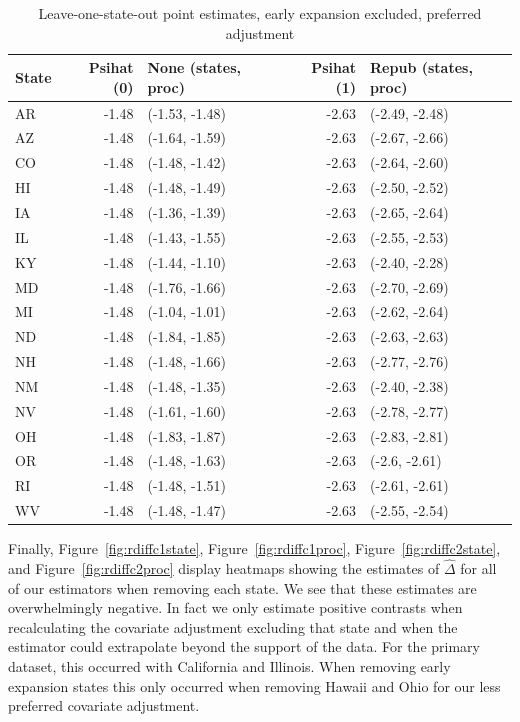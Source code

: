 \documentclass{article}
\begin{document}
\begin{appendix}
\begin{table}[ht]
\centering
   \caption{Leave-one-state-out point estimates, early expansion excluded, preferred adjustment}
    \label{tab:loostatec2}
\begin{tabular}{lrlrl}
  \hline
State & Psihat (0) & None (states, proc) & Psihat (1) & Repub (states, proc) \\ 
  \hline
AR & -1.48 & (-1.53, -1.48) & -2.63 & (-2.49, -2.48) \\ 
  AZ & -1.48 & (-1.64, -1.59) & -2.63 & (-2.67, -2.66) \\ 
  CO & -1.48 & (-1.48, -1.42) & -2.63 & (-2.64, -2.60) \\ 
  HI & -1.48 & (-1.48, -1.49) & -2.63 & (-2.50, -2.52) \\ 
  IA & -1.48 & (-1.36, -1.39) & -2.63 & (-2.65, -2.64) \\ 
  IL & -1.48 & (-1.43, -1.55) & -2.63 & (-2.55, -2.53) \\ 
  KY & -1.48 & (-1.44, -1.10) & -2.63 & (-2.40, -2.28) \\ 
  MD & -1.48 & (-1.76, -1.66) & -2.63 & (-2.70, -2.69) \\ 
  MI & -1.48 & (-1.04, -1.01) & -2.63 & (-2.62, -2.64) \\ 
  ND & -1.48 & (-1.84, -1.85) & -2.63 & (-2.63, -2.63) \\ 
  NH & -1.48 & (-1.48, -1.66) & -2.63 & (-2.77, -2.76) \\ 
  NM & -1.48 & (-1.48, -1.35) & -2.63 & (-2.40, -2.38) \\ 
  NV & -1.48 & (-1.61, -1.60) & -2.63 & (-2.78, -2.77) \\ 
  OH & -1.48 & (-1.83, -1.87) & -2.63 & (-2.83, -2.81) \\ 
  OR & -1.48 & (-1.48, -1.63) & -2.63 & (-2.6, -2.61) \\ 
  RI & -1.48 & (-1.48, -1.51) & -2.63 & (-2.61, -2.61) \\ 
  WV & -1.48 & (-1.48, -1.47) & -2.63 & (-2.55, -2.54) \\ 
   \hline
\end{tabular}
\end{table}

Finally, Figure~\ref{fig:rdiffc1state}, Figure~\ref{fig:rdiffc1proc}, Figure~\ref{fig:rdiffc2state}, and Figure~\ref{fig:rdiffc2proc} display heatmaps showing the estimates of $\hat{\Delta}$ for all of our estimators when removing each state. We see that these estimates are overwhelmingly negative. In fact we only estimate positive contrasts when recalculating the covariate adjustment excluding that state and when the estimator could extrapolate beyond the support of the data. For the primary dataset, this occurred with California and Illinois. When removing early expansion states this only occurred when removing Hawaii and Ohio for our less preferred covariate adjustment.


\end{appendix}
\end{document}
